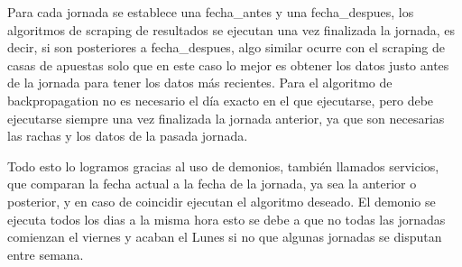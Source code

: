 Para cada jornada se establece una fecha\_antes y una fecha\_despues, los algoritmos de scraping de resultados se ejecutan una vez finalizada la jornada, es decir, si son posteriores a fecha\_despues, algo similar ocurre con el scraping de casas de apuestas solo que en este caso lo mejor es obtener los datos justo antes de la jornada para tener los datos más recientes. Para el algoritmo de backpropagation no es necesario el día exacto en el que ejecutarse, pero debe ejecutarse siempre una vez finalizada la jornada anterior, ya que son necesarias las rachas y los datos de la pasada jornada.

Todo esto lo logramos gracias al uso de demonios, también llamados servicios, que comparan la fecha actual a la fecha de la jornada, ya sea la anterior o posterior, y en caso de coincidir ejecutan el algoritmo deseado. El demonio se ejecuta todos los dias a la misma hora esto se debe a que no todas las jornadas comienzan el viernes y acaban el Lunes si no que algunas jornadas se disputan entre semana.